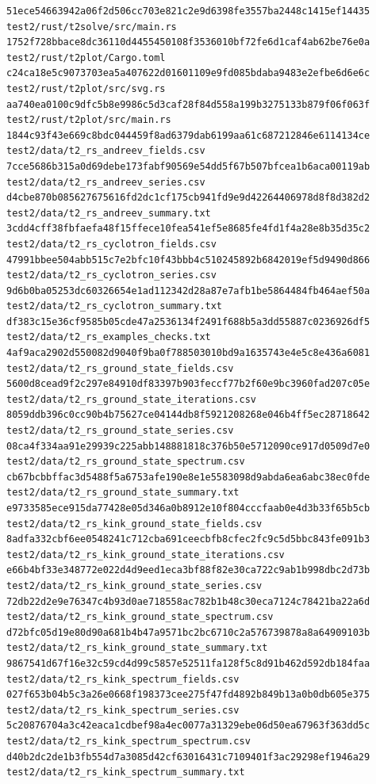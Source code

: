 \documentclass[
  10pt,
]{article}
\begin{document}
\begin{verbatim}
51ece54663942a06f2d506cc703e821c2e9d6398fe3557ba2448c1415ef14435  test2/rust/t2solve/src/main.rs
1752f728bbace8dc36110d4455450108f3536010bf72fe6d1caf4ab62be76e0a  test2/rust/t2plot/Cargo.toml
c24ca18e5c9073703ea5a407622d01601109e9fd085bdaba9483e2efbe6d6e6c  test2/rust/t2plot/src/svg.rs
aa740ea0100c9dfc5b8e9986c5d3caf28f84d558a199b3275133b879f06f063f  test2/rust/t2plot/src/main.rs
1844c93f43e669c8bdc044459f8ad6379dab6199aa61c687212846e6114134ce  test2/data/t2_rs_andreev_fields.csv
7cce5686b315a0d69debe173fabf90569e54dd5f67b507bfcea1b6aca00119ab  test2/data/t2_rs_andreev_series.csv
d4cbe870b085627675616fd2dc1cf175cb941fd9e9d42264406978d8f8d382d2  test2/data/t2_rs_andreev_summary.txt
3cdd4cff38fbfaefa48f15ffece10fea541ef5e8685fe4fd1f4a28e8b35d35c2  test2/data/t2_rs_cyclotron_fields.csv
47991bbee504abb515c7e2bfc10f43bbb4c510245892b6842019ef5d9490d866  test2/data/t2_rs_cyclotron_series.csv
9d6b0ba05253dc60326654e1ad112342d28a87e7afb1be5864484fb464aef50a  test2/data/t2_rs_cyclotron_summary.txt
df383c15e36cf9585b05cde47a2536134f2491f688b5a3dd55887c0236926df5  test2/data/t2_rs_examples_checks.txt
4af9aca2902d550082d9040f9ba0f788503010bd9a1635743e4e5c8e436a6081  test2/data/t2_rs_ground_state_fields.csv
5600d8cead9f2c297e84910df83397b903feccf77b2f60e9bc3960fad207c05e  test2/data/t2_rs_ground_state_iterations.csv
8059ddb396c0cc90b4b75627ce04144db8f5921208268e046b4ff5ec28718642  test2/data/t2_rs_ground_state_series.csv
08ca4f334aa91e29939c225abb148881818c376b50e5712090ce917d0509d7e0  test2/data/t2_rs_ground_state_spectrum.csv
cb67bcbbffac3d5488f5a6753afe190e8e1e5583098d9abda6ea6abc38ec0fde  test2/data/t2_rs_ground_state_summary.txt
e9733585ece915da77428e05d346a0b8912e10f804cccfaab0e4d3b33f65b5cb  test2/data/t2_rs_kink_ground_state_fields.csv
8adfa332cbf6ee0548241c712cba691ceecbfb8cfec2fc9c5d5bbc843fe091b3  test2/data/t2_rs_kink_ground_state_iterations.csv
e66b4bf33e348772e022d4d9eed1eca3bf88f82e30ca722c9ab1b998dbc2d73b  test2/data/t2_rs_kink_ground_state_series.csv
72db22d2e9e76347c4b93d0ae718558ac782b1b48c30eca7124c78421ba22a6d  test2/data/t2_rs_kink_ground_state_spectrum.csv
d72bfc05d19e80d90a681b4b47a9571bc2bc6710c2a576739878a8a64909103b  test2/data/t2_rs_kink_ground_state_summary.txt
9867541d67f16e32c59cd4d99c5857e52511fa128f5c8d91b462d592db184faa  test2/data/t2_rs_kink_spectrum_fields.csv
027f653b04b5c3a26e0668f198373cee275f47fd4892b849b13a0b0db605e375  test2/data/t2_rs_kink_spectrum_series.csv
5c20876704a3c42eaca1cdbef98a4ec0077a31329ebe06d50ea67963f363dd5c  test2/data/t2_rs_kink_spectrum_spectrum.csv
d40b2dc2de1b3fb554d7a3085d42cf63016431c7109401f3ac29298ef1946a29  test2/data/t2_rs_kink_spectrum_summary.txt

\end{verbatim}
\end{document}
